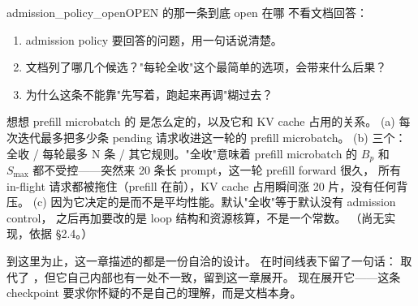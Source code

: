 \begin{checkpoint}{admission_policy_open}{OPEN 的那一条到底 open 在哪}
不看文档回答：
\begin{enumerate}[label=(\alph*)]
  \item admission policy 要回答的问题，用一句话说清楚。
  \item 文档列了哪几个候选？"每轮全收"这个最简单的选项，会带来什么后果？
  \item 为什么这条不能靠"先写着，跑起来再调"糊过去？
\end{enumerate}
\hint 想想 prefill microbatch 的  是怎么定的，以及它和 KV cache 占用的关系。
\ifshowanswers
\tcblower
\answer (a) 每次迭代最多把多少条 pending 请求收进这一轮的 prefill microbatch。
(b) 三个：全收 / 每轮最多 N 条 / 其它规则。"全收"意味着 prefill microbatch 的
$B_p$ 和 $S_{\max}$ 都不受控——突然来 20 条长 prompt，这一轮 prefill forward 很久，
所有 in-flight 请求都被拖住（prefill 在前），KV cache 占用瞬间涨 20 片，没有任何背压。
(c) 因为它决定的是而不是平均性能。默认"全收"等于默认没有 admission control，
之后再加要改的是 loop 结构和资源核算，不是一个常数。
\whereincode （尚无实现，依据  §2.4。）
\fi
\end{checkpoint}

到这里为止，这一章描述的都是一份自洽的设计。 在时间线表下留了一句话：
 取代了 ，但它自己内部也有一处不一致，留到这一章展开。
现在展开它——这条 checkpoint 要求你怀疑的不是自己的理解，而是文档本身。

